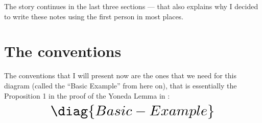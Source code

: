 \documentclass[oneside,12pt]{article}
\begin{document}
The story continues in the last three sections --- that also explains
why I decided to write these notes using the first person in most
places.








%                                                        

\section{The conventions \DONE}
\label{the-conventions}

The conventions that I will present now are the ones that we need for
this diagram (called the ``Basic Example'' from here on), that is
essentially the Proposition 1 in the proof of the Yoneda Lemma in
\cite[Section III.2]{CWM2}:
%
%
\pu
$$\scalebox{2.0}{$
  \diag{Basic-Example}
  $}
$$
\end{document}
